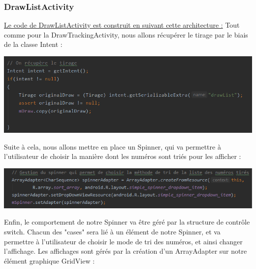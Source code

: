 \documentclass{article}
\begin{document}
\newpage
\subsubsection{DrawListActivity}
\vspace{1em}
\underline{Le code de DrawListActivity est construit en suivant cette architecture :}
\vspace{1em}
\newline Tout comme pour la DrawTrackingActivity, nous allons récupérer le tirage par le biais de la classe Intent :
\newline
\begin{center} \includegraphics[scale=0.8]{intent_DrawListActivity.png} \end{center}
\vspace{1em}
Suite à cela, nous allons mettre en place un Spinner\cite{spinner}, qui va permettre à l'utilisateur de choisir la manière dont les numéros sont triés pour les afficher :
\begin{center} \includegraphics[scale=0.7]{spinner_DrawListActivity.png} \end{center}
Enfin, le comportement de notre Spinner va être géré par la structure de contrôle switch. Chacun des "cases" sera lié à un élément de notre Spinner, et va permettre à l'utilisateur de choisir le mode de tri des numéros, et ainsi changer l'affichage.
\newline Les affichages sont gérés par la création d'un ArrayAdapter\cite{arrayAdapter} sur notre élément graphique GridView\cite{gridview} :
\end{document}
